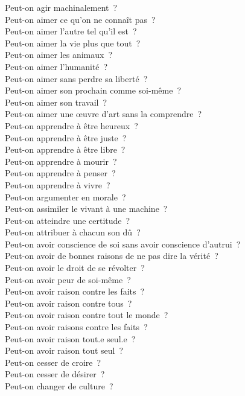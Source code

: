 \documentclass[a4paper,12pt]{article}
\begin{document}
Peut-on agir machinalement ? \\
Peut-on aimer ce qu'on ne connaît pas ? \\
Peut-on aimer l'autre tel qu'il est ? \\
Peut-on aimer la vie plus que tout ? \\
Peut-on aimer les animaux ? \\
Peut-on aimer l'humanité ? \\
Peut-on aimer sans perdre sa liberté ? \\
Peut-on aimer son prochain comme soi-même ? \\
Peut-on aimer son travail ? \\
Peut-on aimer une œuvre d'art sans la comprendre ? \\
Peut-on apprendre à être heureux ? \\
Peut-on apprendre à être juste ? \\
Peut-on apprendre à être libre ? \\
Peut-on apprendre à mourir ? \\
Peut-on apprendre à penser ? \\
Peut-on apprendre à vivre ? \\
Peut-on argumenter en morale ? \\
Peut-on assimiler le vivant à une machine ? \\
Peut-on atteindre une certitude ? \\
Peut-on attribuer à chacun son dû ? \\
Peut-on avoir conscience de soi sans avoir conscience d'autrui ? \\
Peut-on avoir de bonnes raisons de ne pas dire la vérité ? \\
Peut-on avoir le droit de se révolter ? \\
Peut-on avoir peur de soi-même ? \\
Peut-on avoir raison contre les faits ? \\
Peut-on avoir raison contre tous ? \\
Peut-on avoir raison contre tout le monde ? \\
Peut-on avoir raisons contre les faits ? \\
Peut-on avoir raison tout.e seul.e ? \\
Peut-on avoir raison tout seul ? \\
Peut-on cesser de croire ? \\
Peut-on cesser de désirer ? \\
Peut-on changer de culture ? \\
\end{document}
